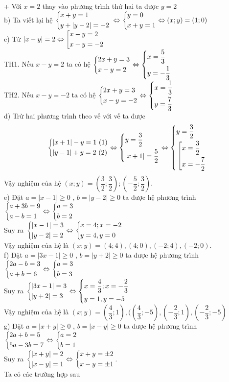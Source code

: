 \begin{ex}
{+ Với    $x=2$ thay vào phương trình thứ  hai ta  được $y=2$\\
b) Ta  viết lại hệ $\left\{\begin{aligned}& x +y=1\\ & y+|y-2|=-2\end{aligned}\right.$ $\Leftrightarrow \left\{\begin{aligned}& y=0\\ & x+y=1\end{aligned}\right. \Leftrightarrow (x;y)=(1;0)$\\
c) Từ  $|x-y|=2\Leftrightarrow \left[\begin{aligned}& x-y=2\\ & x-y =- 2\end{aligned}\right.$\\
TH1. Nếu $x-y=2$ ta có  hệ $\left\{\begin{aligned}& 2x+y=3\\ & x-y=2\end{aligned}\right.\Leftrightarrow \left\{\begin{aligned}& x= \dfrac{5}{3}\\ & y= -\dfrac{1}{3}\end{aligned}\right.$\\
TH2. Nếu $x-y=-2$ ta có  hệ $\left\{\begin{aligned}& 2x+y=3\\ & x-y=-2\end{aligned}\right.\Leftrightarrow \left\{\begin{aligned}& x= \dfrac{1}{3}\\ & y= \dfrac{7}{3}\end{aligned}\right.$\\
    d) Trừ hai phương trình theo vế  với  vế ta  được $$\heva{& |x+1|-y=1\ (1) \\ & |y-1|+y=2\ (2)}\Leftrightarrow \heva{& y=\dfrac{3}{2}\\ & |x+1|=\dfrac{5}{2}}\Leftrightarrow \heva{& y=\dfrac{3}{2}\\ & \hoac{& x=\dfrac{3}{2}\\ & x= -\dfrac{7}{2}}}$$
    Vậy nghiệm của  hệ $(x;y) = \left(\dfrac{3}{2}; \dfrac{3}{2}\right); \left(-\dfrac{5}{2};\dfrac{3}{2}\right)$.\\
e) Đặt $a=|x-1|\ge 0$ , $b=|y-2| \ge 0$    ta được hệ phương trình
$
\left\{\begin{aligned}& a+3b=9\\ & a-b=1\end{aligned}\right.\Leftrightarrow \left\{\begin{aligned}& a=3\\ & b=2\end{aligned}\right.$\\
Suy ra $\left\{\begin{aligned}& | x-1| = 3\\ & |y-2| = 2\end{aligned}\right. \Leftrightarrow \left\{\begin{aligned}& x= 4; x=-2\\
& y= 4, y= 0\end{aligned}\right.$\\
Vậy nghiệm của  hệ là $(x;y) = (4;4), (4;0), (-2;4), (-2;0)$.\\
    f) Đặt $a=|3x-1|\ge 0$ , $b=|y+2| \ge 0$    ta được hệ phương trình
$
\left\{\begin{aligned}& 2 a-b=3\\ & a+b=6\end{aligned}\right.\Leftrightarrow \left\{\begin{aligned}& a=3\\ & b=3\end{aligned}\right.$\\
Suy ra $\left\{\begin{aligned}& | 3x-1| = 3\\ & |y+2| =3\end{aligned}\right. \Leftrightarrow \left\{\begin{aligned}& x=\dfrac{4}{3}; x=-\dfrac{2}{3}\\
& y= 1, y=-5\end{aligned}\right.$\\
Vậy nghiệm của  hệ là $(x;y) = \left(\dfrac{4}{3};1 \right), (\left(\dfrac{4}{3};-5 \right), \left(-\dfrac{2}{3};1 \right), \left(-\dfrac{2}{3};-5 \right)$\\
   g) Đặt $a=|x+y|\ge 0$ , $b=|x-y| \ge 0$    ta được hệ phương trình
$
\left\{\begin{aligned}& 2a+b=5\\ & 5a-3b=7\end{aligned}\right.\Leftrightarrow \left\{\begin{aligned}& a=2\\ & b=1\end{aligned}\right.$\\
Suy ra $\left\{\begin{aligned}& | x+y| =2\\ & |x-y| = 1\end{aligned}\right. \Leftrightarrow \left\{\begin{aligned}& x+y= \pm 2\\ & x-y=\pm 1\end{aligned}\right.$.\\
Ta có  các trường hợp sau

}
\end{ex}
